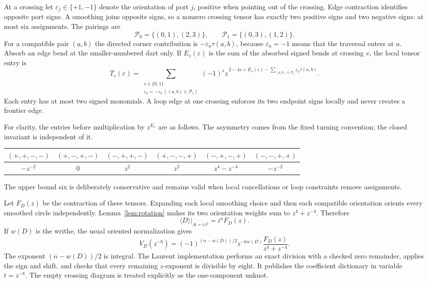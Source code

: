 At a crossing let $\varepsilon_j\in\{+1,-1\}$ denote the orientation of
port $j$, positive when pointing out of the crossing. Edge contraction
identifies opposite port signs. A smoothing joins opposite signs, so a
nonzero crossing tensor has exactly two positive signs and two negative
signs: at most six assignments. The pairings are
\[
 \mathcal P_0=\{(0,1),(2,3)\},\qquad
 \mathcal P_1=\{(0,3),(1,2)\}.
\]
For a compatible pair $(a,b)$ the directed corner contribution is
$-\varepsilon_a\tau(a,b)$, because $\varepsilon_a=-1$ means that the
traversal enters at $a$. Absorb an edge bend at the smaller-numbered dart
only. If $E_v(\varepsilon)$ is the sum of the absorbed signed bends at
crossing $v$, the local tensor entry is
\begin{equation}
 T_v(\varepsilon)=
 \sum_{\substack{s\in\{0,1\}\\
           \varepsilon_a=-\varepsilon_b\ ((a,b)\in\mathcal P_s)}}
 (-1)^s z^{\,2-4s+E_v(\varepsilon)
                   -\sum_{(a,b)\in\mathcal P_s}\varepsilon_a\tau(a,b)}.
 \label{eq:local-tensor}
\end{equation}
Each entry has at most two signed monomials. A loop edge at one crossing
enforces its two endpoint signs locally and never creates a frontier edge.

For clarity, the entries before multiplication by $z^{E_v}$ are as follows.
The asymmetry comes from the fixed turning convention; the closed invariant
is independent of it.
\begin{center}
\begin{tabular}{@{}cccccc@{}}
\toprule
$(+,+,-,-)$ & $(+,-,+,-)$ & $(-,+,+,-)$ & $(+,-,-,+)$ & $(-,+,-,+)$ & $(-,-,+,+)$\\
\midrule
$-z^{-2}$ & $0$ & $z^2$ & $z^2$ & $z^4-z^{-4}$ & $-z^{-2}$\\
\bottomrule
\end{tabular}
\end{center}
The upper bound six is deliberately conservative and remains valid when
local cancellations or loop constraints remove assignments.

Let $F_D(z)$ be the contraction of these tensors. Expanding each local
smoothing choice and then each compatible orientation orients every
smoothed circle independently. Lemma~\ref{lem:rotation} makes its two
orientation weights sum to $z^4+z^{-4}$. Therefore
\begin{equation}
 \langle D\rangle\big|_{A=i z^2}=i^nF_D(z).
 \label{eq:bracket-tensor}
\end{equation}
If $w(D)$ is the writhe, the usual oriented normalization gives
\begin{equation}
 V_D(z^{-8})=
 (-1)^{(n-w(D))/2}z^{-6w(D)}
 \frac{F_D(z)}{z^4+z^{-4}}.
 \label{eq:jones-normalization}
\end{equation}
The exponent $(n-w(D))/2$ is integral. The Laurent implementation performs
an exact division with a checked zero remainder, applies the sign and shift,
and checks that every remaining $z$-exponent is divisible by eight. It
publishes the coefficient dictionary in variable $t=z^{-8}$. The empty
crossing diagram is treated explicitly as the one-component unknot.

